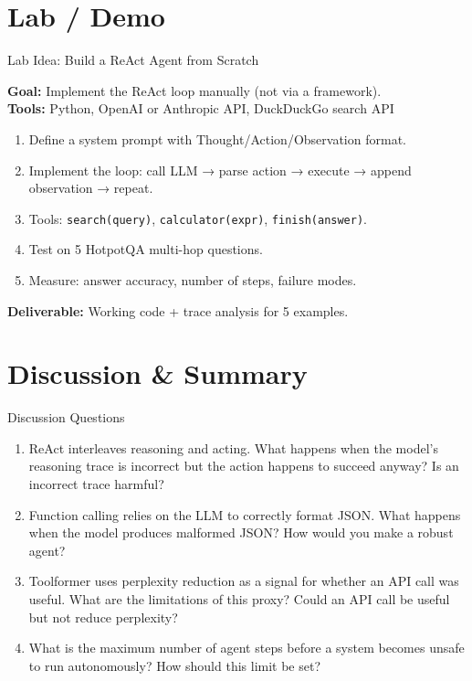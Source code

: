 \documentclass[aspectratio=169,10pt]{beamer}
\begin{document}
\section{Lab / Demo}
\begin{frame}{Lab Idea: Build a ReAct Agent from Scratch}
  \begin{tcolorbox}[hitbox, title=Lab 7 — ReAct Agent]
    \textbf{Goal:} Implement the ReAct loop manually (not via a framework).\\[4pt]
    \textbf{Tools:} Python, OpenAI or Anthropic API, DuckDuckGo search API
    \begin{enumerate}
      \item Define a system prompt with Thought/Action/Observation format.
      \item Implement the loop: call LLM → parse action → execute → append observation → repeat.
      \item Tools: \texttt{search(query)}, \texttt{calculator(expr)}, \texttt{finish(answer)}.
      \item Test on 5 HotpotQA multi-hop questions.
      \item Measure: answer accuracy, number of steps, failure modes.
    \end{enumerate}
    \textbf{Deliverable:} Working code + trace analysis for 5 examples.
  \end{tcolorbox}
\end{frame}

\section{Discussion \& Summary}
\begin{frame}{Discussion Questions}
  \begin{enumerate}
    \item ReAct interleaves reasoning and acting. What happens when the model's reasoning trace is incorrect but the action happens to succeed anyway? Is an incorrect trace harmful?
    \item Function calling relies on the LLM to correctly format JSON. What happens when the model produces malformed JSON? How would you make a robust agent?
    \item Toolformer uses perplexity reduction as a signal for whether an API call was useful. What are the limitations of this proxy? Could an API call be useful but not reduce perplexity?
    \item What is the maximum number of agent steps before a system becomes unsafe to run autonomously? How should this limit be set?
  \end{enumerate}
\end{frame}
\end{document}
